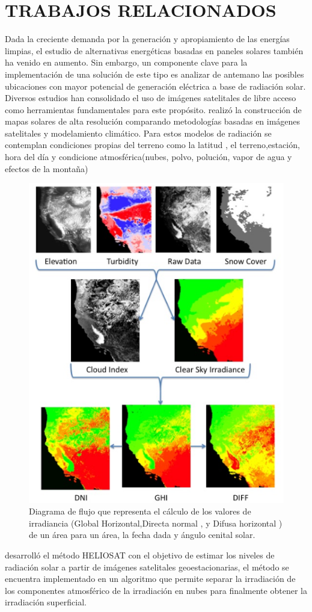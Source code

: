 \chapter{TRABAJOS RELACIONADOS}
Dada la creciente demanda por la generación y apropiamiento de las energías limpias, el estudio de alternativas energéticas basadas en paneles 
solares también ha venido en aumento. Sin embargo, un componente clave para la implementación de una solución de este tipo es analizar de antemano 
las posibles ubicaciones con mayor potencial de generación eléctrica a base de radiación solar. Diversos estudios han consolidado el uso de imágenes 
satelitales de libre acceso como herramientas fundamentales para este propósito. \cite{kaku2009creating} realizó la construcción de mapas solares de alta 
resolución comparando metodologías basadas en imágenes satelitales y modelamiento climático. Para estos modelos de radiación se contemplan condiciones 
propias del terreno como la latitud , el terreno,estación, hora del día y condicione atmosférica(nubes, polvo, polución, vapor de agua y efectos de la montaña)
\begin{figure}[ht]
  \centering 
  \includegraphics[scale=0.47]{pictures/ER1.png}
  \caption{Diagrama de flujo que representa el cálculo de los valores de irradiancia (Global Horizontal,Directa normal , y Difusa horizontal ) 
  de un área para un área, la fecha dada y ángulo cenital solar.} 
  \label{fig:er1}
\end{figure}
\newpage
\cite{hammer2003solarenergy} desarrolló el método HELIOSAT con el 
objetivo de estimar los niveles de radiación solar a partir de imágenes satelitales geoestacionarias, el método se encuentra implementado 
en un algoritmo que permite separar la irradiación de los componentes atmosférico de la irradiación en nubes para finalmente obtener la 
irradiación superficial.

